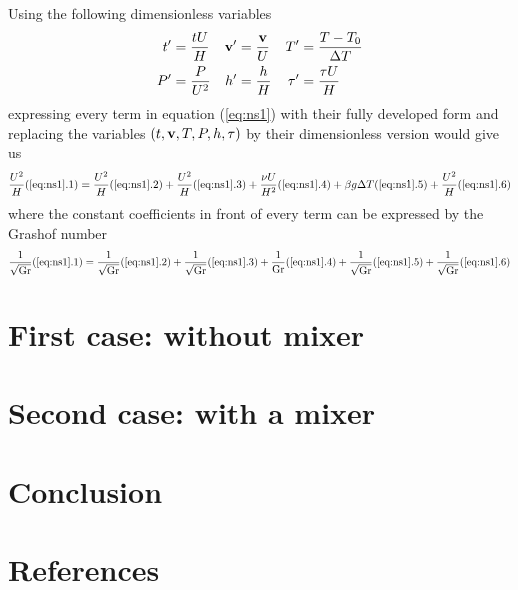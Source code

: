 \documentclass[a4paper,10pt]{scrartcl}
\newcommand\Gr{\mathrm{Gr}}
\begin{document}
Using the following dimensionless variables
\begin{align}
	t' &= \frac{tU}{H} & \vb{v'} &= \frac{\vb{v}}{U} & T' &= \frac{T-T_0}{\Delta T} \nonumber\\
	P' &= \frac{P}{U^2} & h' &= \frac{h}{H} & \tau' &= \frac{\tau U}{H} \nonumber
\end{align}
expressing every term in equation (\ref{eq:ns1}) with their fully developed form and replacing the variables $(t,\vb{v},T,P,h,\tau)$ by their dimensionless version would give us
\begin{equation}
	\frac{U^2}{H}(\ref{eq:ns1}.1) = \frac{U^2}{H}(\ref{eq:ns1}.2) + \frac{U^2}{H}(\ref{eq:ns1}.3) + \frac{\nu U}{H^2}(\ref{eq:ns1}.4) + \beta g \Delta T(\ref{eq:ns1}.5) + \frac{U^2}{H}(\ref{eq:ns1}.6)
\end{equation}
where the constant coefficients in front of every term can be expressed by the Grashof number
\begin{equation} \frac{1}{\sqrt{\Gr}}(\ref{eq:ns1}.1) = \frac{1}{\sqrt{\Gr}}(\ref{eq:ns1}.2) + \frac{1}{\sqrt{\Gr}}(\ref{eq:ns1}.3) + \frac{1}{\Gr}(\ref{eq:ns1}.4) + \frac{1}{\sqrt{\Gr}}(\ref{eq:ns1}.5) + \frac{1}{\sqrt{\Gr}}(\ref{eq:ns1}.6) \end{equation}

\section{First case: without mixer}
\section{Second case: with a mixer}
\section{Conclusion}
\section{References}
\printbibliography
\end{document}
